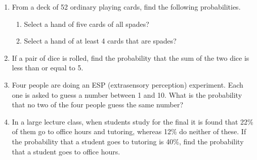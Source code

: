 \documentclass{article}
\begin{document}
\begin{enumerate}
    \item From a deck of 52 ordinary playing cards, find the following probabilities.
    \begin{enumerate}
        \item Select a hand of five cards of all spades?\vspace{80pt}%
        \item Select a hand of at least 4 cards that are spades?\vspace{80pt}%
    \end{enumerate}

    \item If a pair of dice is rolled, find the probability that the sum of the two dice is less than or equal to 5.\vspace{80pt}%
    
    \item Four people are doing an ESP (extrasensory perception) experiment. Each one is asked to guess a number between 1 and 10. What is the probability that no two of the four people guess the same number?\vspace{60pt}%
    
    \item In a large lecture class, when students study for the final it is found that 22\% of them go to office hours and tutoring, whereas 12\% do neither of these. If the probability that a student goes to tutoring is 40\%, find the probability that a student goes to office hours.\vspace{50pt}%

\end{enumerate}
\end{document}

